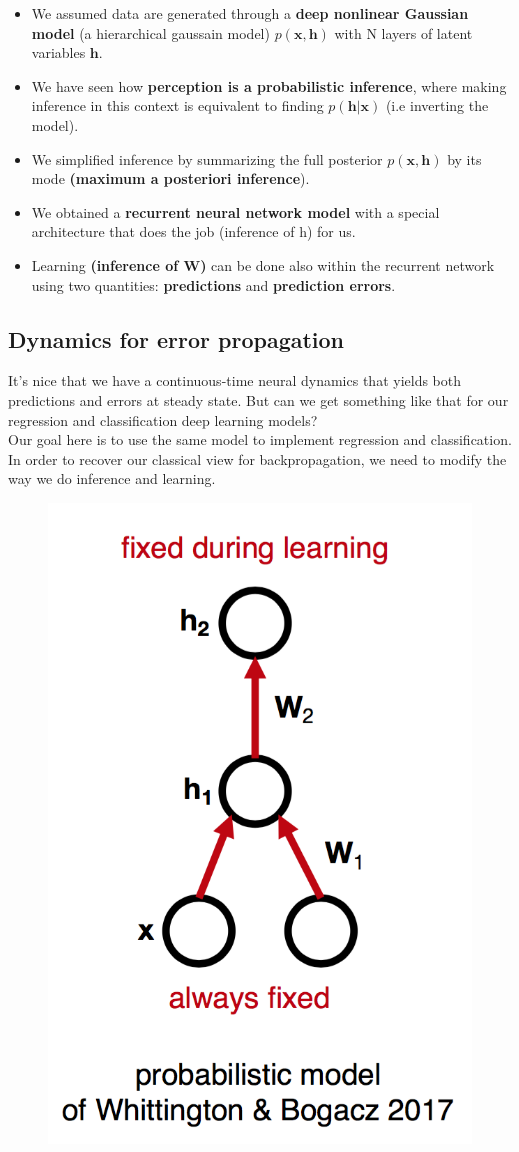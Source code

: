\documentclass[main]{subfiles}
\begin{document}
\begin{itemize}
    \item We assumed data are generated through a \textbf{deep nonlinear Gaussian model} (a hierarchical gaussain model) $p(\bm{x}, \bm{h})$ with N layers of latent variables $\bm{h}$.
    
    \item We have seen how \textbf{perception is a probabilistic inference}, where making inference in this context is equivalent to finding $p(\bm{h}|\bm{x})$ (i.e inverting the model).

    \item We simplified inference by summarizing the full posterior $p(\bm{x}, \bm{h})$ by its mode \textbf{(maximum a posteriori inference}).
    
    \item We obtained a \textbf{recurrent neural network model} with a special architecture that does the job (inference of h) for us.
    
    \item Learning \textbf{(inference of W)} can be done also within the recurrent network using two quantities: \textbf{predictions} and \textbf{prediction errors}.
    
\end{itemize}
\subsection{Dynamics for error propagation}

It’s nice that we have a continuous-time neural dynamics that yields both predictions and errors at steady state. But can we get something like that for our regression and classification deep learning models?\\

\noindent Our goal here is to use the same model to implement regression and classification. In order to recover our classical view for backpropagation, we need to modify the way we do inference and learning.
\begin{figure}[H]
        \centering
        \includegraphics[width=0.4\linewidth]{06_PredictionErrorsDuringPerceptionAndLearning/figures/HGM_backprop.png}
        \label{fig:autoencoder}
\end{figure}
\end{document}

